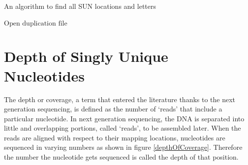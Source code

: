 \begin{algorithm}
\caption{An algorithm to find all SUN locations and letters}
\label{allSun}
\begin{algorithmic}[1]
\State $\text{Open duplication file}$
\Else
{}
\EndIf
{}
\Else
{}
\EndIf
\EndFor
\EndIf
\EndProcedure
\end{algorithmic}
\end{algorithm}
\section{Depth of Singly Unique Nucleotides}
The depth or coverage, a term that entered the literature thanks to the next generation sequencing, is defined as the number of `reads' that include a particular nucleotide. In next generation sequencing, the DNA is separated into little and overlapping portions, called `reads', to be assembled later. When the reads are aligned with respect to their mapping locations, nucleotides are sequenced in varying numbers as shown in figure \ref{depthOfCoverage}. Therefore the number the nucleotide gets sequenced is called the depth of that position.

